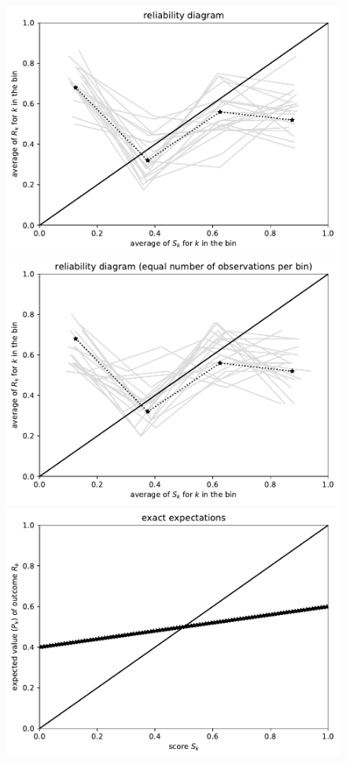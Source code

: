 \documentclass{article}
\begin{document}
\begin{figure}
\begin{centering}
\parbox{\imsize}{\includegraphics[width=\imsize]
                {./codes/unweighted/100_4_0_0/equiprob.pdf}}
\quad\quad
\parbox{\imsize}{\includegraphics[width=\imsize]
                {./codes/unweighted/100_4_0_0/equisamp.pdf}}

\vspace{\vertsep}

\parbox{\imsize}{\includegraphics[width=\imsize]
                {./codes/unweighted/100_4_0_0/exact.pdf}}


\end{centering}
\end{figure}
\end{document}

